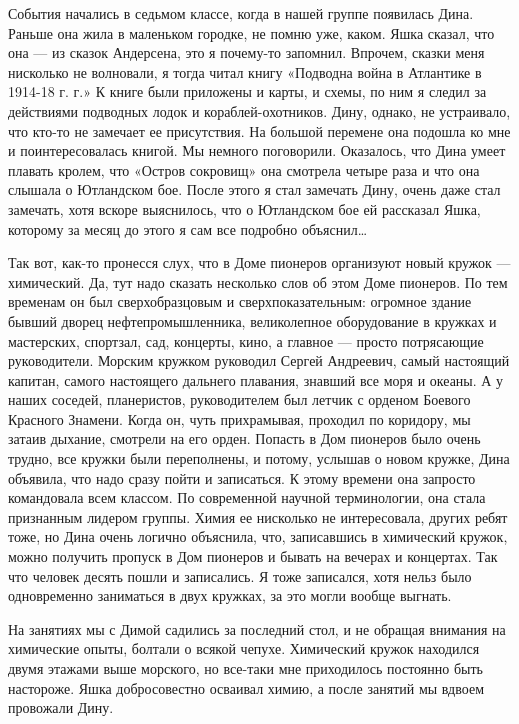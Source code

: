 События начались в седьмом  классе, когда в  нашей группе появилась  Дина.
Раньше она жила в маленьком городке, не помню уже, каком. Яшка сказал, что
она — из сказок Андерсена, это я почему-то запомнил. Впрочем, сказки  меня
нисколько не волновали, я тогда читал книгу «Подводна война в Атлантике  в
1914-18 г. г.» К книге были приложены и карты, и схемы, по ним я следил за
действиями  подводных  лодок  и   кораблей-охотников.  Дину,  однако,   не
устраивало, что кто-то не замечает ее присутствия. На большой перемене она
подошла  ко  мне  и   поинтересовалась  книгой.  Мы  немного   поговорили.
Оказалось, что  Дина  умеет  плавать кролем,  что  «Остров  сокровищ»  она
смотрела четыре раза  и что она  слышала о Ютландском  бое. После этого  я
стал замечать Дину, очень даже стал замечать, хотя вскоре выяснилось,  что
о Ютландском бое ей рассказал Яшка, которому  за месяц до этого я сам  все
подробно объяснил…

Так вот, как-то пронесся слух, что в Доме пионеров организуют новый кружок
— химический. Да, тут надо сказать  несколько слов об этом Доме  пионеров.
По тем  временам он  был  сверхобразцовым и  сверхпоказательным:  огромное
здание  бывший  дворец  нефтепромышленника,  великолепное  оборудование  в
кружках и мастерских, спортзал,  сад, концерты, кино,  а главное —  просто
потрясающие руководители.  Морским  кружком  руководил  Сергей  Андреевич,
самый настоящий капитан, самого настоящего дальнего плавания, знавший  все
моря и океаны. А у наших соседей, планеристов, руководителем был летчик  с
орденом Боевого Красного Знамени. Когда он, чуть прихрамывая, проходил  по
коридору, мы затаив дыхание, смотрели на его орден. Попасть в Дом пионеров
было очень трудно, все кружки были переполнены, и потому, услышав о  новом
кружке, Дина объявила, что надо сразу пойти и записаться. К этому  времени
она  запросто   командовала   всем   классом.   По   современной   научной
терминологии, она стала признанным лидером  группы. Химия ее нисколько  не
интересовала, других ребят  тоже, но  Дина очень  логично объяснила,  что,
записавшись в химический кружок, можно  получить пропуск в Дом пионеров  и
бывать на вечерах и концертах. Так что человек десять пошли и  записались.
Я тоже записался, хотя нельз было одновременно заниматься в двух  кружках,
за это могли вообще выгнать.

На занятиях мы с Димой садились  за последний стол, и не обращая  внимания
на химические опыты, болтали о всякой чепухе. Химический кружок  находился
двумя этажами выше  морского, но все-таки  мне приходилось постоянно  быть
настороже. Яшка добросовестно  осваивал химию, а  после занятий мы  вдвоем
провожали Дину.

